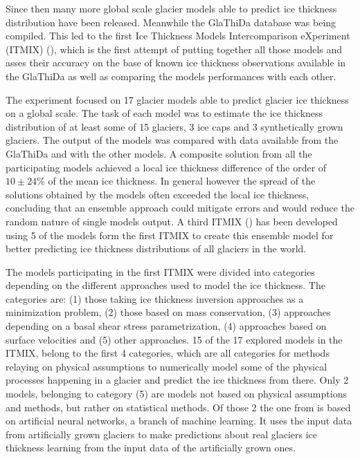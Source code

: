 Since then many more global scale glacier models able to predict ice thickness distribution have been released. Meanwhile the GlaThiDa database was being compiled. This led to the first Ice Thickness Models Intercomparison eXperiment (ITMIX) (\cite{Farinotti2017}), which is the first attempt of putting together all those models and asses their accuracy on the base of known ice thickness observations available in the GlaThiDa as well as comparing the models performances with each other. 

The experiment focused on 17 glacier models able to predict glacier ice thickness on a global scale. The task of each model was to estimate the ice thickness distribution of at least some of 15 glaciers, 3 ice caps and 3 synthetically grown glaciers. The output of the models was compared with data available from the GlaThiDa and with the other models. A composite solution from all the participating models achieved a local ice thickness difference of the order of $10 \pm 24\%$ of the mean ice thickness. In general however the spread of the solutions obtained by the models often exceeded the local ice thickness, concluding that an ensemble approach could mitigate errors and would reduce the random nature of single models output. A third ITMIX (\cite{Farinotti2019}) has been developed using 5 of the models form the first ITMIX to create this ensemble model for better predicting ice thickness distributions of all glaciers in the world.  

The models participating in the first ITMIX were divided into categories depending on the different approaches used to model the ice thickness. The categories are: (1) those taking ice thickness inversion approaches as a minimization problem, (2) those based on mass conservation,  (3) approaches depending on a basal shear stress parametrization, (4) approaches based on surface velocities and (5) other approaches. 15 of the 17 explored models in the ITMIX, belong to the first 4 categories, which are all categories for methods relaying on physical assumptions to numerically model some of the physical processes happening in a glacier and predict the ice thickness from there. Only 2 models, belonging to category (5) are models not based on physical assumptions and methods, but rather on statistical methods. Of those 2 the one from \citet{Clarke2009} is based on artificial neural networks, a branch of machine learning. It uses the input data from artificially grown glaciers to make predictions about real glaciers ice thickness learning from the input data of the artificially grown ones.

